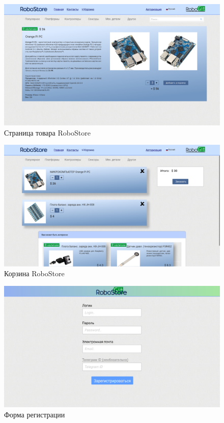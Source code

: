 \documentclass[12pt, a4paper]{article}
\begin{document}
\begin{figure}[H]
  \centering
  \includegraphics[width=16cm]{png/store_item.png}
  \caption{Страница товара RoboStore}
\end{figure}

\begin{figure}[H]
  \centering
  \includegraphics[width=16cm]{png/store_bin.png}
  \caption{Корзина RoboStore}
\end{figure}

\begin{figure}[H]
  \centering
  \includegraphics[width=16cm]{png/store_sign.png}
  \caption{Форма регистрации}
\end{figure}
\end{document}
